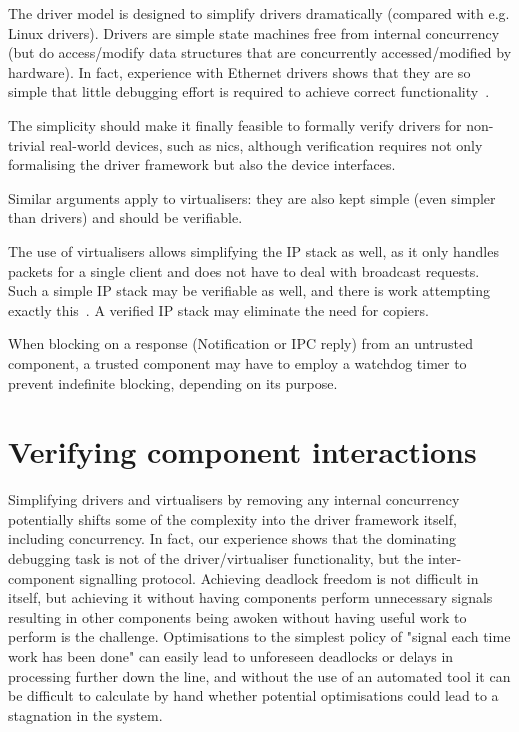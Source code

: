 \documentclass[a4paper,12pt]{report}
\begin{document}
The driver model is designed to simplify drivers dramatically
(compared with e.g. Linux drivers).  Drivers are simple state machines
free from internal concurrency (but do access/modify data structures
that are concurrently accessed/modified by hardware). In fact,
experience with Ethernet drivers shows that they are so simple that
little debugging effort is required to achieve correct
functionality~\citep{Parker:bsc}.

The simplicity should make it finally feasible to formally verify
drivers for non-trivial real-world devices, such as \glspl{nic},
although verification requires not only formalising the driver framework
but also the device interfaces.

Similar arguments apply to virtualisers: they are also kept
simple (even simpler than drivers)  and
should be verifiable.

The use of virtualisers allows simplifying the IP stack as well, as it
only handles packets for a single client and does not have to deal
with broadcast requests. Such a simple IP stack may be verifiable as
well, and there is work attempting exactly this~\citep{Rollins_23}. A
verified IP stack may eliminate the need for copiers.

When blocking on a response (Notification or IPC reply) from an
untrusted component, a trusted component may have to employ a watchdog timer
to prevent indefinite blocking, depending on its purpose.

\section{Verifying component interactions}

Simplifying drivers and virtualisers by removing any internal
concurrency potentially shifts some of the complexity into the driver
framework itself, including concurrency. In fact, our experience shows
that the dominating debugging task is not of the driver/virtualiser
functionality, but the inter-component signalling protocol. Achieving
deadlock freedom is not difficult in itself, but achieving it without having
components perform unnecessary signals resulting in other components
being awoken without having useful work to perform is the challenge.
Optimisations to the simplest policy of "signal each time work has been
done" can easily lead to unforeseen deadlocks or delays in processing
further down the line, and without the use of an automated tool it can
be difficult to calculate by hand whether potential optimisations could
lead to a stagnation in the system.
\end{document}
